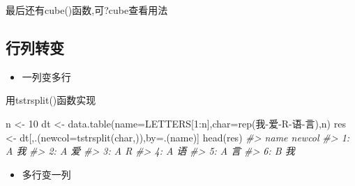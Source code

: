 \documentclass[
]{book}
\newenvironment{Shaded}{\begin{snugshade}}{\end{snugshade}}
\newcommand{\AttributeTok}[1]{\textcolor[rgb]{0.77,0.63,0.00}{#1}}
\newcommand{\CommentTok}[1]{\textcolor[rgb]{0.56,0.35,0.01}{\textit{#1}}}
\newcommand{\DecValTok}[1]{\textcolor[rgb]{0.00,0.00,0.81}{#1}}
\newcommand{\FunctionTok}[1]{\textcolor[rgb]{0.00,0.00,0.00}{#1}}
\newcommand{\NormalTok}[1]{#1}
\newcommand{\OtherTok}[1]{\textcolor[rgb]{0.56,0.35,0.01}{#1}}
\newcommand{\SpecialCharTok}[1]{\textcolor[rgb]{0.00,0.00,0.00}{#1}}
\newcommand{\StringTok}[1]{\textcolor[rgb]{0.31,0.60,0.02}{#1}}
\providecommand{\tightlist}{%
  \setlength{\itemsep}{0pt}\setlength{\parskip}{0pt}}
\begin{document}
最后还有cube()函数,可?cube查看用法

\hypertarget{ux884cux5217ux8f6cux53d8}{%
\subsection{行列转变}\label{ux884cux5217ux8f6cux53d8}}

\begin{itemize}
\tightlist
\item
  一列变多行
\end{itemize}

用tstrsplit()函数实现

\begin{Shaded}
\begin{Highlighting}[]
\NormalTok{n }\OtherTok{\textless{}{-}} \DecValTok{10}
\NormalTok{dt }\OtherTok{\textless{}{-}} \FunctionTok{data.table}\NormalTok{(}\AttributeTok{name=}\NormalTok{LETTERS[}\DecValTok{1}\SpecialCharTok{:}\NormalTok{n],}\AttributeTok{char=}\FunctionTok{rep}\NormalTok{(}\StringTok{\textquotesingle{}我{-}爱{-}R{-}语{-}言\textquotesingle{}}\NormalTok{),n)}
\NormalTok{res }\OtherTok{\textless{}{-}}\NormalTok{ dt[,.(}\AttributeTok{newcol=}\FunctionTok{tstrsplit}\NormalTok{(char,}\StringTok{\textquotesingle{}{-}\textquotesingle{}}\NormalTok{)),by}\OtherTok{=}\NormalTok{.(name)]}
\FunctionTok{head}\NormalTok{(res)}
\CommentTok{\#\textgreater{}    name newcol}
\CommentTok{\#\textgreater{} 1:    A     我}
\CommentTok{\#\textgreater{} 2:    A     爱}
\CommentTok{\#\textgreater{} 3:    A      R}
\CommentTok{\#\textgreater{} 4:    A     语}
\CommentTok{\#\textgreater{} 5:    A     言}
\CommentTok{\#\textgreater{} 6:    B     我}
\end{Highlighting}
\end{Shaded}

\begin{itemize}
\tightlist
\item
  多行变一列
\end{itemize}
\end{document}

